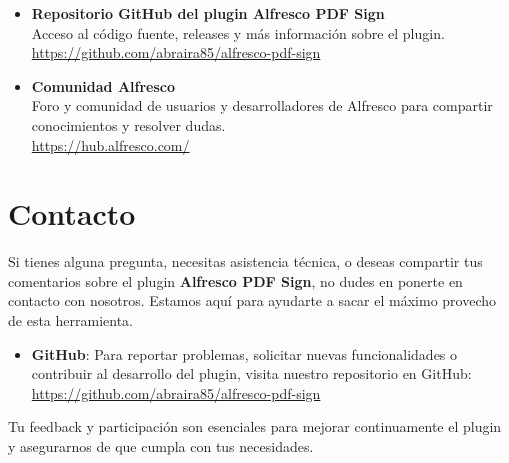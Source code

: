 \documentclass{template/ol-softwaremanual}
\begin{document}
\begin{itemize}
	\item \textbf{Repositorio GitHub del plugin Alfresco PDF Sign}\\
	Acceso al código fuente, releases y más información sobre el plugin.\\
	\url{https://github.com/abraira85/alfresco-pdf-sign}
	
	\item \textbf{Comunidad Alfresco}\\
	Foro y comunidad de usuarios y desarrolladores de Alfresco para compartir conocimientos y resolver dudas.\\
	\url{https://hub.alfresco.com/}
\end{itemize}

\section{Contacto}

Si tienes alguna pregunta, necesitas asistencia técnica, o deseas compartir tus comentarios sobre el plugin \textbf{Alfresco PDF Sign}, no dudes en ponerte en contacto con nosotros. Estamos aquí para ayudarte a sacar el máximo provecho de esta herramienta.

\begin{itemize}
	\item \textbf{GitHub}: Para reportar problemas, solicitar nuevas funcionalidades o contribuir al desarrollo del plugin, visita nuestro repositorio en GitHub: \url{https://github.com/abraira85/alfresco-pdf-sign}
\end{itemize}

Tu feedback y participación son esenciales para mejorar continuamente el plugin y asegurarnos de que cumpla con tus necesidades.
\end{document}
